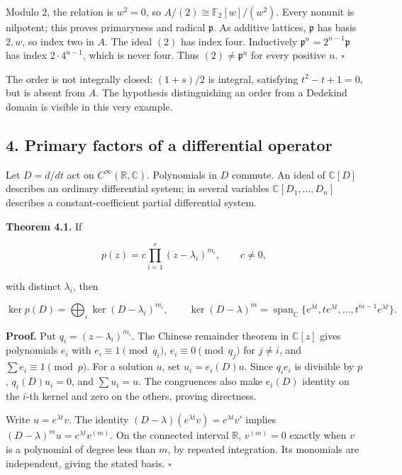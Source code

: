 \documentclass[
]{article}
\begin{document}
Modulo \(2\), the relation is \(w^2=0\), so
\(A/(2)\cong\mathbb F_2[w]/(w^2)\). Every nonunit is nilpotent; this
proves primaryness and radical \(\mathfrak p\). As additive lattices,
\(\mathfrak p\) has basis \(2,w\), so index two in \(A\). The ideal
\((2)\) has index four. Inductively \(\mathfrak p^n=2^{n-1}\mathfrak p\)
has index \(2\cdot4^{n-1}\), which is never four. Thus
\((2)\ne\mathfrak p^n\) for every positive \(n\). \(\square\)

The order is not integrally closed: \((1+s)/2\) is integral, satisfying
\(t^2-t+1=0\), but is absent from \(A\). The hypothesis distinguishing
an order from a Dedekind domain is visible in this very example.

\subsection{4. Primary factors of a differential
operator}\label{primary-factors-of-a-differential-operator}

Let \(D=d/dt\) act on \(C^\infty(\mathbb R,\mathbb C)\). Polynomials in
\(D\) commute. An ideal of \(\mathbb C[D]\) describes an ordinary
differential system; in several variables \(\mathbb C[D_1,\ldots,D_n]\)
describes a constant-coefficient partial differential system.

\textbf{Theorem 4.1.} If

\[
p(z)=c\prod_{i=1}^r(z-\lambda_i)^{m_i},\qquad c\ne0,
\]

with distinct \(\lambda_i\), then

\[
\ker p(D)=\bigoplus_i\ker(D-\lambda_i)^{m_i},
\qquad
\ker(D-\lambda)^m
=\operatorname{span}_{\mathbb C}\{e^{\lambda t},te^{\lambda t},\ldots,t^{m-1}e^{\lambda t}\}.
\]

\textbf{Proof.} Put \(q_i=(z-\lambda_i)^{m_i}\). The Chinese remainder
theorem in \(\mathbb C[z]\) gives polynomials \(e_i\) with
\(e_i\equiv1\pmod{q_i}\), \(e_i\equiv0\pmod{q_j}\) for \(j\ne i\), and
\(\sum e_i\equiv1\pmod{p}\). For a solution \(u\), set \(u_i=e_i(D)u\).
Since \(q_i e_i\) is divisible by \(p\), \(q_i(D)u_i=0\), and
\(\sum u_i=u\). The congruences also make \(e_i(D)\) identity on the
\(i\)-th kernel and zero on the others, proving directness.

Write \(u=e^{\lambda t}v\). The identity
\((D-\lambda)(e^{\lambda t}v)=e^{\lambda t}v'\) implies
\((D-\lambda)^mu=e^{\lambda t}v^{(m)}\). On the connected interval
\(\mathbb R\), \(v^{(m)}=0\) exactly when \(v\) is a polynomial of
degree less than \(m\), by repeated integration. Its monomials are
independent, giving the stated basis. \(\square\)
\end{document}
